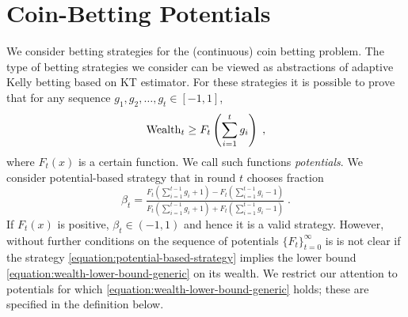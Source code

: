 \section{Coin-Betting Potentials}
\label{section:coin-betting-potentials}

We consider betting strategies for the (continuous) coin betting problem. The
type of betting strategies we consider can be viewed as abstractions of
adaptive Kelly betting based on KT estimator. For these strategies it is
possible to prove that for any sequence $g_1, g_2, \dots, g_t \in [-1,1]$,
\begin{equation}
\label{equation:wealth-lower-bound-generic}
\operatorname{Wealth}_t \ge F_t \left( \sum_{i=1}^t g_i \right) \; ,
\end{equation}
where $F_t(x)$ is a certain function. We call such functions \emph{potentials}.
We consider potential-based strategy that in round $t$ chooses fraction
\begin{equation}
\label{equation:potential-based-strategy}
\beta_t = \tfrac{F_t(\sum_{i=1}^{t-1} g_i + 1) - F_t(\sum_{i=1}^{t-1} g_i - 1)}{F_t(\sum_{i=1}^{t-1} g_i + 1) + F_t(\sum_{i=1}^{t-1} g_i - 1)} \; .
\end{equation}
If $F_t(x)$ is positive, $\beta_t \in (-1,1)$ and hence it is a valid
strategy. However, without further conditions on the sequence of potentials
$\{F_t\}_{t=0}^\infty$ is is not clear if the strategy
\eqref{equation:potential-based-strategy} implies the lower bound
\eqref{equation:wealth-lower-bound-generic} on its wealth. We restrict our
attention to potentials for which \eqref{equation:wealth-lower-bound-generic}
holds; these are specified in the definition below.

